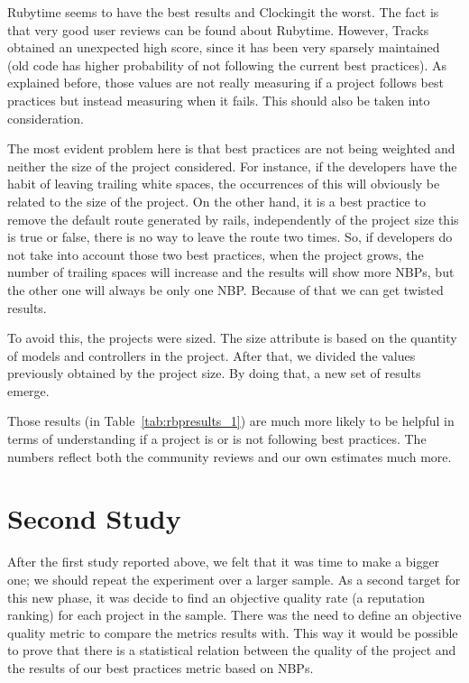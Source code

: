 

Rubytime seems to have the best results and Clockingit the worst. 
The fact is that very good user reviews can be found about Rubytime.
However, Tracks obtained an unexpected high score, since it has been very sparsely maintained 
(old code has higher probability of not following the current best practices).
As explained before, those values are not really measuring if a project follows best practices 
but instead measuring when it fails.
This should also be taken into consideration. 

The most evident problem here is that best practices are not being weighted and neither the size of the project considered.
For instance, if the developers have the habit of leaving trailing white spaces, 
the occurrences of this will obviously be related to the size of the project.
On the other hand, it is a best practice to remove the default route generated by rails, 
independently of the project size this is true or false, there is no way to leave the route two times. 
So, if developers do not take into account those two best practices, when the project grows, 
the number of trailing spaces will increase and the results will show more NBPs, 
but the other one will always be only one NBP.  
Because of that we can get twisted results.

To avoid this, the projects were sized.
The size attribute is based on the quantity of models and controllers in the project.
After that, we divided the values previously obtained  by the project size.
By doing that, a new set of results emerge.



Those results (in Table~\ref{tab:rbpresults_1}) are much more likely to be helpful in terms of understanding if a project is or is not following 
best practices.
The numbers reflect both the community reviews and our own estimates much more.



\section{Second Study}\label{subsec:second_study}
After the first study reported above, we felt that it was time to make a bigger one;
we should repeat the experiment over a larger sample. 
As a second target for this new phase, it was decide to find an objective quality rate (a reputation ranking) 
for each project in the sample.
There was the need to define an objective quality metric to compare the metrics results with.
This way it would be possible to prove that there is a statistical relation between the quality of the project
and the results of our best practices metric based on NBPs.

